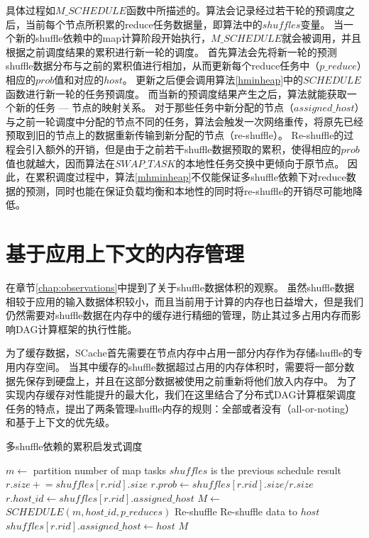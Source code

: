 具体过程如$M\_SCHEDULE$函数中所描述的。算法会记录经过若干轮的预调度之后，当前每个节点所积累的reduce任务数据量，即算法中的$shuffles$变量。
当一个新的shuffle依赖中的map计算阶段开始执行，$M\_SCHEDULE$就会被调用，并且根据之前调度结果的累积进行新一轮的调度。
首先算法会先将新一轮的预测shuffle数据分布与之前的累积值进行相加，从而更新每个reduce任务中（$p\_reduce$）相应的$prob$值和对应的$host$。
更新之后便会调用算法\ref{hminheap}中的$SCHEDULE$函数进行新一轮的任务预调度。
而当新的预调度结果产生之后，算法就能获取一个新的任务 --- 节点的映射关系。
对于那些任务中新分配的节点（$assigned\_host$）与之前一轮调度中分配的节点不同的任务，算法会触发一次网络重传，将原先已经预取到旧的节点上的数据重新传输到新分配的节点（re-shuffle）。
Re-shuffle的过程会引入额外的开销，但是由于之前若干shuffle数据预取的累积，使得相应的$prob$值也就越大，因而算法在$SWAP\_TASK$的本地性任务交换中更倾向于原节点。
因此，在累积调度过程中，算法\ref{mhminheap}不仅能保证多shuffle依赖下对reduce数据的预测，同时也能在保证负载均衡和本地性的同时将re-shuffle的开销尽可能地降低。

\section{基于应用上下文的内存管理}

在章节\ref{chap:observations}中提到了关于shuffle数据体积的观察。
虽然shuffle数据相较于应用的输入数据体积较小，而且当前用于计算的内存也日益增大，但是我们仍然需要对shuffle数据在内存中的缓存进行精细的管理，防止其过多占用内存而影响DAG计算框架的执行性能。

为了缓存数据，SCache首先需要在节点内存中占用一部分内存作为存储shuffle的专用内存空间。
当其中缓存的shuffle数据超过占用的内存体积时，需要将一部分数据先保存到硬盘上，并且在这部分数据被使用之前重新将他们放入内存中。
为了实现内存缓存对性能提升的最大化，我们在这里结合了分布式DAG计算框架调度任务的特点，提出了两条管理shuffle内存的规则：全部或者没有（all-or-noting）和基于上下文的优先级。

\begin{algorithm}[H]
	\caption{多shuffle依赖的累积启发式调度}
	\label{mhminheap}
	\begin{algorithmic}[1]
		\small
			\State $m\gets$ partition number of map tasks
			\Comment $shuffles$ is the previous schedule result
				\State $r.size \mathrel{+}= shuffles\left[r.rid\right].size$
					\State $r.prob\gets shuffles\left[r.rid\right].size / r.size$
					\State $r.host\_id\gets shuffles\left[r.rid\right].assigned\_host$
				\EndIf
			\EndFor
			\State $M\gets$ $SCHEDULE\left(m, host\_id, p\_reduces\right)$
				\Comment Re-shuffle
					\State Re-shuffle data to $host$
					\State $shuffles\left[r.rid\right].assigned\_host\gets host$
					\EndIf
				\EndFor
			\EndFor
			\Return $M$
		\EndProcedure
	\end{algorithmic}
\end{algorithm}

